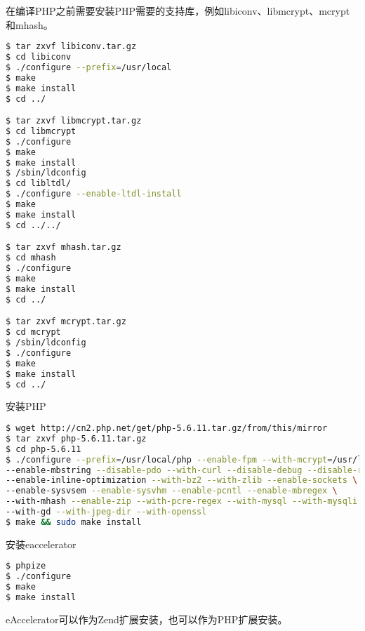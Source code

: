 在编译PHP之前需要安装PHP需要的支持库，例如libiconv、libmcrypt、mcrypt和mhash。


\begin{lstlisting}[language=bash]
$ tar zxvf libiconv.tar.gz
$ cd libiconv
$ ./configure --prefix=/usr/local
$ make
$ make install
$ cd ../

$ tar zxvf libmcrypt.tar.gz
$ cd libmcrypt
$ ./configure
$ make
$ make install
$ /sbin/ldconfig
$ cd libltdl/
$ ./configure --enable-ltdl-install
$ make
$ make install
$ cd ../../

$ tar zxvf mhash.tar.gz
$ cd mhash
$ ./configure
$ make 
$ make install
$ cd ../

$ tar zxvf mcrypt.tar.gz
$ cd mcrypt
$ /sbin/ldconfig
$ ./configure
$ make
$ make install
$ cd ../
\end{lstlisting}



安装PHP


\begin{lstlisting}[language=bash]
$ wget http://cn2.php.net/get/php-5.6.11.tar.gz/from/this/mirror
$ tar zxvf php-5.6.11.tar.gz
$ cd php-5.6.11
$ ./configure --prefix=/usr/local/php --enable-fpm --with-mcrypt=/usr/local/libmcrypt \
--enable-mbstring --disable-pdo --with-curl --disable-debug --disable-rpath \
--enable-inline-optimization --with-bz2 --with-zlib --enable-sockets \
--enable-sysvsem --enable-sysvhm --enable-pcntl --enable-mbregex \
--with-mhash --enable-zip --with-pcre-regex --with-mysql --with-mysqli \
--with-gd --with-jpeg-dir --with-openssl
$ make && sudo make install
\end{lstlisting}

安装eaccelerator

\begin{lstlisting}[language=bash]
$ phpize
$ ./configure 
$ make
$ make install
\end{lstlisting}

eAccelerator可以作为Zend扩展安装，也可以作为PHP扩展安装。

